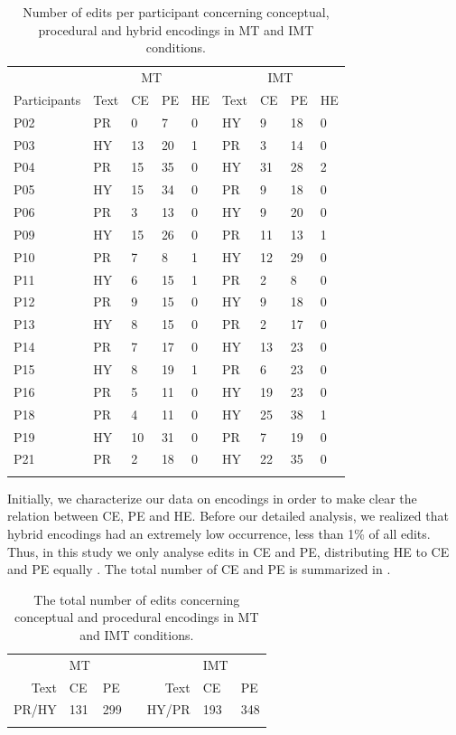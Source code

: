 \documentclass[output=paper]{langsci/langscibook}
\begin{document}
\begin{table}[p]
\begin{tabularx}{\textwidth}{lXXXXXXXX}
\lsptoprule 
& \multicolumn{4}{c}{MT} & \multicolumn{4}{c}{IMT} \\
Participants & Text & CE & PE & HE & Text & CE & PE & HE \\
\midrule
P02 & PR & 0 & 7 & 0  & HY & 9 & 18 & 0\\
P03 & HY & 13 & 20 & 1  & PR & 3 & 14 & 0\\
P04 & PR & 15 & 35 & 0  & HY & 31 & 28 & 2\\
P05 & HY & 15 & 34 & 0  & PR & 9 & 18 & 0\\
P06 & PR & 3 & 13 & 0  & HY & 9 & 20 & 0\\
P09 & HY & 15 & 26 & 0  & PR & 11 & 13 & 1\\
P10 & PR & 7 & 8 & 1  & HY & 12 & 29 & 0\\
P11 & HY & 6 & 15 & 1  & PR & 2 & 8 & 0\\
P12 & PR & 9 & 15 & 0  & HY & 9 & 18 & 0\\
P13 & HY & 8 & 15 & 0  & PR & 2 & 17 & 0\\
P14 & PR & 7 & 17 & 0  & HY & 13 & 23 & 0\\
P15 & HY & 8 & 19 & 1  & PR & 6 & 23 & 0\\
P16 & PR & 5 & 11 & 0  & HY & 19 & 23 & 0\\
P18 & PR & 4 & 11 & 0  & HY & 25 & 38 & 1\\
P19 & HY & 10 & 31 & 0  & PR & 7 & 19 & 0\\
P21 & PR & 2 & 18 & 0  & HY & 22 & 35 & 0\\
\lspbottomrule
\end{tabularx}
\caption{Number of edits per participant concerning conceptual, procedural and hybrid encodings in MT and IMT conditions.}
\label{sarto:tab:1}
\end{table}



Initially, we characterize our data on encodings in order to make clear the relation between CE, PE and HE.  Before our detailed analysis, we realized that hybrid encodings had an extremely low occurrence, less than 1\% of all edits. Thus, in this study we only analyse edits in CE and PE, distributing HE to CE and PE equally \citep[cf.][]{alves2013}. The total number of CE and PE is summarized in .

\begin{table}[p]
\begin{tabular}{rllcrll}
\lsptoprule
{~} & {MT} & ~ && {~} & {IMT} & ~\\
Text & CE & PE && Text & CE & PE\\
\midrule
PR/HY & 131 & 299 && HY/PR & 193 & 348\\
\lspbottomrule
\end{tabular}
\caption{The total number of edits concerning conceptual and procedural encodings in MT and IMT conditions.}
\label{sarto:tab:2}
\end{table}
\end{document}
